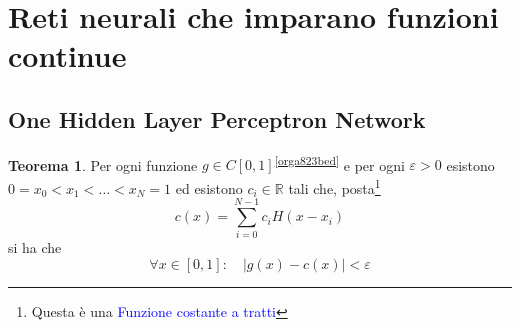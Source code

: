 \documentclass[10pt]{book}
\newcommand{\1}{\mathds{1}}
\newcommand{\R}{\mathds{R}}
\theoremstyle{definition}%
\newtheorem{thm}{Teorema}[section]
\theoremstyle{plain}
\theoremstyle{remark}
\renewcommand{\href}[2]{\textcolor{blue}{#2}}
\begin{document}
\section{Reti neurali che imparano funzioni continue}
\label{sec:org25279af}

\subsection{One Hidden Layer Perceptron Network}
\label{sec:org18af059}

\begin{thm}
Per ogni funzione \(g \in C[0,1]\)\textsuperscript{\ref{orga823bed}} e per ogni \(\varepsilon>0\) esistono \(0=x_{0}<x_{1}<\dots<x_{N} = 1\) ed esistono \(c_{i} \in \R\) tali che, posta\footnote{Questa è una \href{../../../../../org/roam/20250701140621-funzione_costante_a_tratti.org}{Funzione costante a tratti}}
\begin{equation*}
c(x) = \sum_{i=0}^{N-1} c_{i} H(x-x_{i})
\end{equation*}
si ha che
\begin{equation*}
\forall x \in [0,1]:\quad |g(x)-c(x)|<\varepsilon
\end{equation*}
\end{thm}
\end{document}
